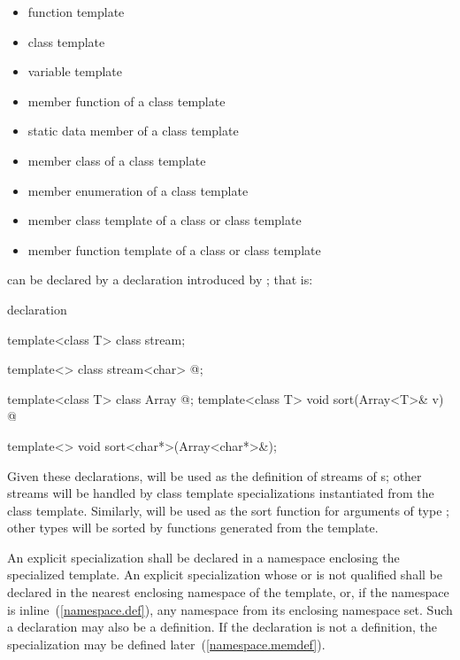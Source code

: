 \begin{itemize}
\item
function template
\item
class template
\item
variable template
\item
member function of a class template
\item
static data member of a class template
\item
member class of a class template
\item
member enumeration of a class template
\item
member class template of a class or class template
\item
member function template of a class or class template
\end{itemize}

can be declared by a declaration introduced by
;
that is:
%

\begin{bnf}
\br
   declaration
\end{bnf}

\begin{example}
\begin{codeblock}
template<class T> class stream;

template<> class stream<char> { @\commentellip@ };

template<class T> class Array { @\commentellip@ };
template<class T> void sort(Array<T>& v) { @\commentellip@ }

template<> void sort<char*>(Array<char*>&);
\end{codeblock}

Given these declarations,
will be used as the definition of streams of
s;
other streams will be handled by class template specializations instantiated
from the class template.
Similarly,
will be used as the sort function for arguments
of type
;
other
types will be sorted by functions generated from the template.
\end{example}

\pnum
An explicit specialization shall be declared in a namespace enclosing the specialized template.
An explicit specialization
whose  or  is not qualified
shall be declared in the nearest enclosing namespace of the template,
or, if the namespace is inline~(\ref{namespace.def}), any namespace from its enclosing namespace set.
Such a declaration may also be a definition.
If the declaration is not a definition, the specialization may be
defined later~(\ref{namespace.memdef}).

